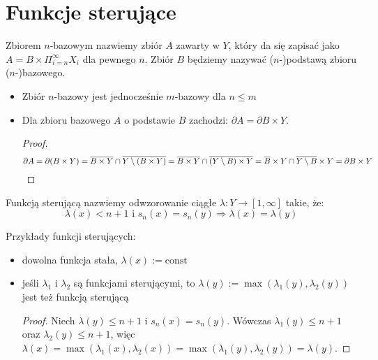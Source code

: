 




\section{Funkcje sterujące}
\begin{df}
Zbiorem $n$-bazowym nazwiemy zbiór $A$ zawarty w $Y$, który da się zapisać jako $A = B \times \Pi_{i=n}^\infty X_i$ dla pewnego $n$. Zbiór $B$ będziemy nazywać ($n$-)podstawą zbioru ($n$-)bazowego.
\end{df}


\begin{note}
\begin{itemize}
  \item Zbiór $n$-bazowy jest jednocześnie $m$-bazowy dla $n \leq m$
  \item Dla zbioru bazowego $A$ o podstawie $B$ zachodzi: $\partial A = \partial B \times Y$.
  \begin{proof}
    $$\partial A = \partial(B \times Y) = \overline{B \times Y} \cap \overline{Y \setminus (B \times Y)} = \overline{B \times Y} \cap \overline{(Y \setminus B) \times Y} = \overline{B} \times Y \cap \overline{Y \setminus B} \times Y = \partial{B} \times Y$$
  \end{proof}
\end{itemize}

\end{note}


\begin{df}
Funkcją sterującą nazwiemy odwzorowanie ciągłe $\lambda: Y \rightarrow [1,\infty]$ takie, że:
$$\lambda(x) < n+1 \mbox{ i } s_n(x) = s_n(y) \Rightarrow \lambda(x) = \lambda(y)$$
\end{df}

\begin{note}
Przykłady funkcji sterujących:
  \begin{itemize}
    \item dowolna funkcja stała, $\lambda(x) := \mbox{const}$
    \item jeśli $\lambda_1$ i $\lambda_2$ są funkcjami sterującymi, to $\lambda(y) := \max(\lambda_1(y), \lambda_2(y))$ jest też funkcją sterującą
  \begin{proof}
    Niech $\lambda(y) \leq n+1$ i $s_n(x) = s_n(y)$. Wówczas $\lambda_1(y) \leq n+1$ oraz $\lambda_2(y) \leq n+1$, więc $\lambda(x) = \max(\lambda_1(x), \lambda_2(x)) = \max(\lambda_1(y), \lambda_2(y)) = \lambda(y)$.
  \end{proof}
  \end{itemize}
\end{note}


